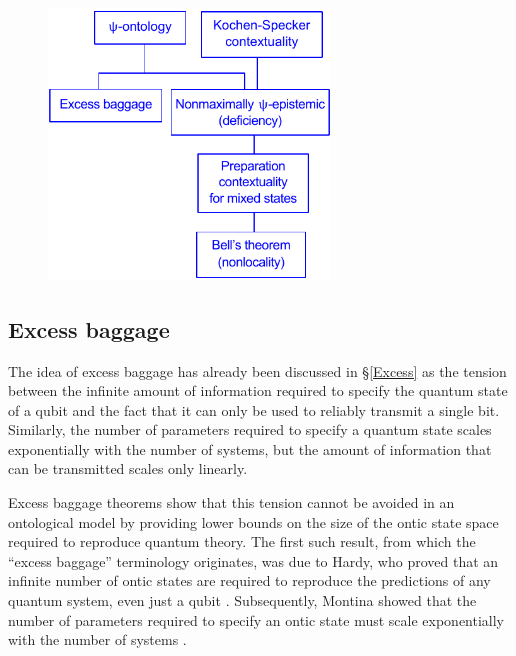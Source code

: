 \documentclass[DIV=calc,fontsize=12pt]{scrartcl} %
\theoremstyle{definition}
\theoremstyle{plain}
\begin{document}
\begin{figure}[t!]
\centering
\includegraphics[width=75mm]{Fig10.pdf}
\caption{}
\end{figure}

\subsection{Excess baggage}

\label{EBT}

The idea of excess baggage has already been discussed in
\S\ref{Excess} as the tension between the infinite amount of
information required to specify the quantum state of a qubit and the
fact that it can only be used to reliably transmit a single bit.
Similarly, the number of parameters required to specify a quantum
state scales exponentially with the number of systems, but the amount
of information that can be transmitted scales only linearly.

Excess baggage theorems show that this tension cannot be avoided in an
ontological model by providing lower bounds on the size of the ontic
state space required to reproduce quantum theory.  The first such
result, from which the ``excess baggage'' terminology originates, was
due to Hardy, who proved that an infinite number of ontic states are
required to reproduce the predictions of any quantum system, even just
a qubit \cite{Hardy2004}.  Subsequently, Montina showed that the
number of parameters required to specify an ontic state must scale
exponentially with the number of systems \cite{Montina2008,
Montina2011}.
\end{document}
